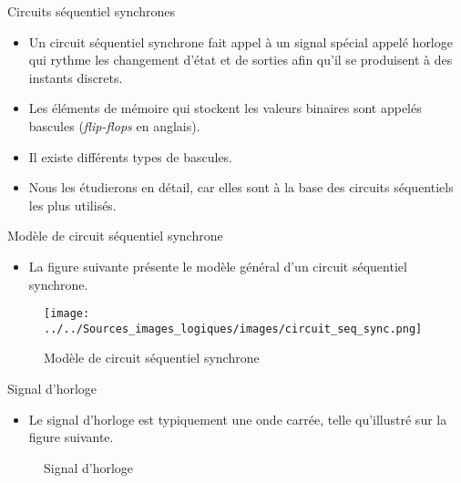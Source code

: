 \documentclass[presentation]{beamer}
\begin{document}
\begin{frame}[label={sec:orgd781935}]{Circuits séquentiel synchrones}
\begin{itemize}
\item Un circuit séquentiel synchrone fait appel à un signal spécial appelé \alert{horloge} qui rythme les changement d'état et de sorties afin qu'il se produisent à des instants discrets.

\item Les éléments de mémoire qui stockent les valeurs binaires sont appelés \alert{bascules} (\emph{flip-flops} en anglais).

\item Il existe différents types de bascules.

\item Nous les étudierons en détail, car elles sont à la base des circuits séquentiels les plus utilisés.
\end{itemize}
\end{frame}

\begin{frame}[label={sec:orgba4412c}]{Modèle de circuit séquentiel synchrone}
\begin{itemize}
\item La figure suivante présente le modèle général d'un circuit séquentiel synchrone.
\end{itemize}

\begin{figure}[htbp]
\centering
\texttt{[image: ../../Sources\_images\_logiques/images/circuit\_seq\_sync.png]}
\caption{\label{fig:orgbbc7650}Modèle de circuit séquentiel synchrone}
\end{figure}
\end{frame}

\begin{frame}[label={sec:org21885ac}]{Signal d'horloge}
\begin{itemize}
\item Le signal d'horloge est typiquement une onde carrée, telle qu'illustré sur la figure suivante.
\end{itemize}

\begin{figure}[htbp]
\centering

\caption{\label{fig:orge6d4e62}Signal d'horloge}
\end{figure}
\end{frame}
\end{document}
